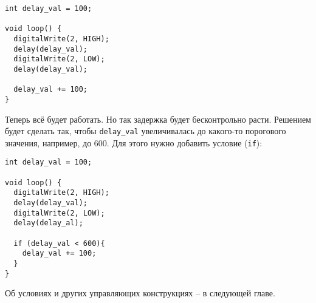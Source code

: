 \documentclass[../sparc.tex]{subfiles}
\begin{document}
\begin{verbatim}
int delay_val = 100;

void loop() {
  digitalWrite(2, HIGH);
  delay(delay_val);
  digitalWrite(2, LOW);
  delay(delay_val);

  delay_val += 100;
}
\end{verbatim}

Теперь всё будет работать. Но так задержка будет бесконтрольно расти. Решением
будет сделать так, чтобы \texttt{delay\_val} увеличивалась до какого-то
порогового значения, например, до 600. Для этого нужно добавить условие
(\texttt{if}):

\begin{verbatim}
int delay_val = 100;

void loop() {
  digitalWrite(2, HIGH);
  delay(delay_val);
  digitalWrite(2, LOW);
  delay(delay_al);

  if (delay_val < 600){
    delay_val += 100;
  }
}
\end{verbatim}

Об условиях и других управляющих конструкциях -- в следующей главе.
\end{document}
